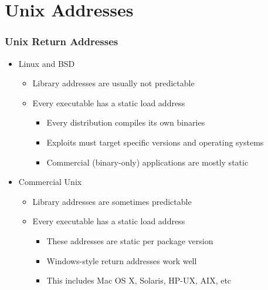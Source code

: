 \documentclass{beamer}
\newenvironment{sitemize}{\vspace{1mm}\begin{itemize}\itemsep 4pt\small}{\end{itemize}}
\begin{document}
\section{Unix Addresses}
\begin{frame}[t]
	\frametitle{Unix Return Addresses}
	
	\begin{sitemize}
		\item Linux and BSD	
		\begin{sitemize}
			\item Library addresses are usually not predictable
			\item Every executable has a static load address
			\begin{sitemize}
				\item Every distribution compiles its own binaries
				\item Exploits must target specific versions and operating systems
				\item Commercial (binary-only) applications are mostly static
			\end{sitemize}
		\end{sitemize}
	\end{sitemize}
	
	\pause
	\begin{sitemize}
		\item Commercial Unix
		\begin{sitemize}
			\item Library addresses are sometimes predictable
			\item Every executable has a static load address
			\begin{sitemize}
				\item These addresses are static per package version
				\item Windows-style return addresses work well
				\item This includes Mac OS X, Solaris, HP-UX, AIX, etc
			\end{sitemize}
		\end{sitemize}
	\end{sitemize}
\end{frame}
\end{document}
